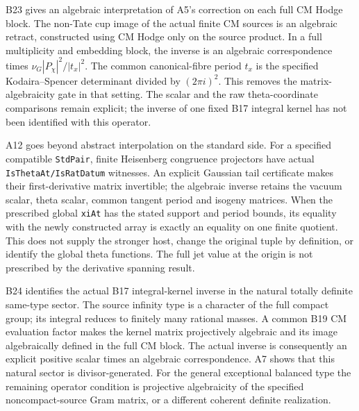 B23 gives an algebraic interpretation of A5's correction on
each full CM Hodge block. The non-Tate cup image of the actual
finite CM sources is an algebraic retract, constructed using
CM Hodge only on the source product. In a full multiplicity
and embedding block, the inverse is an algebraic correspondence
times $\nu_G|P_\chi|^2/|t_x|^2$. The common canonical-fibre
period $t_x$ is the specified Kodaira--Spencer determinant
divided by $(2\pi i)^2$. This removes the matrix-algebraicity
gate in that setting. The scalar and the raw theta-coordinate
comparisons remain explicit; the inverse of one fixed B17
integral kernel has not been identified with this operator.

A12 goes beyond abstract interpolation on the standard side.
For a specified compatible \texttt{StdPair}, finite
Heisenberg congruence projectors have actual
\texttt{IsThetaAt/IsRatDatum} witnesses. An explicit Gaussian
tail certificate makes their first-derivative matrix invertible;
the algebraic inverse retains the vacuum scalar, theta scalar,
common tangent period and isogeny matrices. When the prescribed
global \texttt{xiAt} has the stated support and period bounds,
its equality with the newly constructed array is exactly an
equality on one finite quotient. This does not supply the
stronger host, change the original tuple by definition, or
identify the global theta functions. The full jet value at
the origin is not prescribed by the derivative spanning result.

B24 identifies the actual B17 integral-kernel inverse in the
natural totally definite same-type sector. The source infinity
type is a character of the full compact group; its integral
reduces to finitely many rational masses. A common B19 CM
evaluation factor makes the kernel matrix projectively
algebraic and its image algebraically defined in the full CM
block. The actual inverse is consequently an explicit positive
scalar times an algebraic correspondence. A7 shows that this
natural sector is divisor-generated. For the general
exceptional balanced type the remaining operator condition is
projective algebraicity of the specified noncompact-source
Gram matrix, or a different coherent definite realization.

